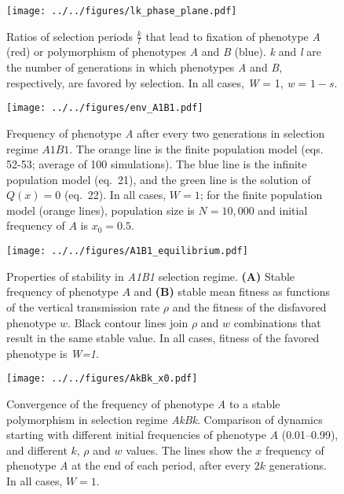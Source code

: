 \documentclass[]{article}
\newcommand{\beginsupplement}{%
	\setcounter{table}{0}
	\renewcommand{\thetable}{S\arabic{table}}%
	\setcounter{figure}{0}
	\renewcommand{\thefigure}{S\arabic{figure}}%
}
\begin{document}
\beginsupplement

\begin{figure}
\centering
\texttt{[image: ../../figures/lk\_phase\_plane.pdf]}
\caption{Ratios of selection periods \(\frac{k}{l}\) that lead to
fixation of phenotype \emph{A} (red) or polymorphism of phenotypes
\emph{A} and \emph{B} (blue). \emph{k} and \emph{l} are the number of
generations in which phenotypes \emph{A} and \emph{B}, respectively, are favored by selection.
In all cases, \emph{W} = 1, \emph{w} = \(1-s\).}\label{fig:lk_phase_plane}
\end{figure}

\begin{figure}
\centering
\texttt{[image: ../../figures/env\_A1B1.pdf]}
\caption{Frequency of phenotype \emph{A} after every two generations in
selection regime \(A1B1\). The orange line is the finite population model
(eqs. 52-53; average of 100 simulations). The blue line is the infinite population model
(eq.\ 21), and the green line is the  solution of \(Q(x)=0\) (eq.\ 22). In all cases, \(W=1\); for the finite population model (orange lines), population size is \(N=10,000\) and initial frequency of \(A\) is \(x_0=0.5\).}\label{fig:env_A1B1}
\end{figure}

\begin{figure}
\centering
\texttt{[image: ../../figures/A1B1\_equilibrium.pdf]}
\caption{Properties of stability in \emph{A1B1} selection regime.
\textbf{(A)} Stable frequency of phenotype $A$ and \textbf{(B)} stable mean fitness as functions of the vertical transmission rate \(\rho\) and the fitness of the disfavored phenotype \(w\).
Black contour lines join \(\rho\) and \(w\) combinations that result in the same stable value.
In all cases, fitness of the favored phenotype is \emph{W=1}.
}\label{fig:A1B1_equilibrium}
\end{figure}

\begin{figure}
\centering
\texttt{[image: ../../figures/AkBk\_x0.pdf]}
\caption{Convergence of the frequency of phenotype \emph{A} to a stable polymorphism in selection regime \emph{AkBk}.
Comparison of dynamics starting with different initial frequencies of phenotype \(A\) (0.01--0.99), and different $k$, $\rho$ and $w$ values.
The lines show the $x$ frequency of phenotype \emph{A} at the end of each period, after every $2k$ generations.
In all cases, $W=1$.}\label{fig:AkBk_x0}
\end{figure}
\end{document}
